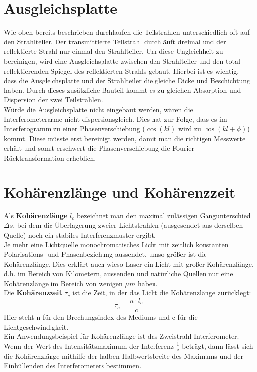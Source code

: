 \section{Ausgleichsplatte}
Wie oben bereits beschrieben durchlaufen die Teilstrahlen 
unterschiedlich oft auf den Strahlteiler. Der transmittierte Teilstrahl durchläuft dreimal 
und der reflektierte Strahl nur einmal den Strahlteiler. Um 
diese Ungleichheit zu bereinigen, wird eine Ausgleichsplatte 
zwischen den Strahlteiler und den total reflektierenden Spiegel 
des reflektierten Strahls gebaut. Hierbei ist es wichtig, 
dass die Ausgleichsplatte und der Strahlteiler die gleiche Dicke und Beschichtung
haben. Durch dieses zusätzliche Bauteil kommt es zu gleichen 
Absorption und Dispersion der zwei Teilstrahlen. \\
Würde die Ausgleichsplatte nicht eingebaut werden, wären die Interferometerarme
nicht dispersionsgleich. Dies hat zur Folge, dass es im Interferogramm zu einer
Phasenverschiebung ($\cos(kl)$ wird zu $\cos(kl+\phi)$) kommt.
Diese müsste erst bereinigt werden, damit man die richtigen Messwerte 
erhält und somit erschwert die Phasenverschiebung die Fourier Rücktransformation
erheblich. \citep[vgl.][]{Zusatzliteratur}

\section{Kohärenzlänge und Kohärenzzeit}
Als \textbf{Kohärenzlänge} $l_c$ bezeichnet man den maximal zulässigen 
Gangunterschied $\Delta s$, bei dem die Überlagerung zweier Lichtstrahlen (ausgesendet aus
derselben Quelle) noch ein stabiles Interferenzmuster ergibt. \\
Je mehr eine Lichtquelle monochromatisches Licht mit zeitlich konstanten
Polarisations- und Phasenbeziehung aussendet, umso größer ist die Kohärenzlänge.
Dies erklärt auch wieso Laser ein Licht mit großer Kohärenzlänge, d.h. im Bereich von 
Kilometern, aussenden und natürliche Quellen nur eine Kohärenzlänge im Bereich von wenigen $\mu m$ haben.\\
Die \textbf{Kohärenzzeit} $\tau_c$ ist die Zeit, in der 
das Licht die Kohärenzlänge zurücklegt:
\begin{equation*}
    \tau_c = \frac{n \cdot l_c}{c}
\end{equation*}
Hier steht n für den Brechungsindex des Mediums und c für 
die Lichtgeschwindigkeit. \\
Ein Anwendungsbeispiel für Kohärenzlänge ist das Zweistrahl
Interferometer. 
Wenn der Wert des Intensitätsmaximum der Interferenz 
$\frac{1}{\text{e}}$ beträgt, dann lässt sich die Kohärenzlänge 
mithilfe der halben Halbwertsbreite des Maximums und der Einhüllenden 
des Interferometers bestimmen. 
\citep[vgl.][]{wikik,Zusatzliteratur}
\newpage

